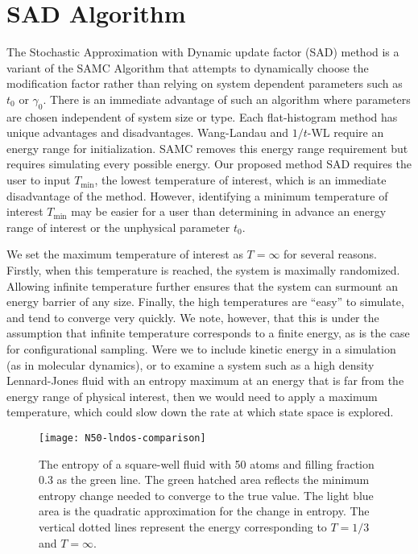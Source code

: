 \documentclass[letterpaper,twocolumn,amsmath,amssymb,pre,aps,10pt]{revtex4-1}
\begin{document}
\section{SAD Algorithm}\label{sec:sad}
The Stochastic Approximation with Dynamic update factor (SAD) method
is a variant of the SAMC Algorithm that attempts to dynamically choose
the modification factor rather than relying on system dependent
parameters such as $t_0$ or $\gamma_0$.  There is an immediate
advantage of such an algorithm where parameters are chosen independent
of system size or type. Each flat-histogram method has unique
advantages and disadvantages.  Wang-Landau and $1/t$-WL require an
energy range for initialization.  SAMC removes this energy range
requirement but requires simulating every possible energy. Our
proposed method SAD requires the user to input $T_\text{min}$, the
lowest temperature of interest, which is an immediate disadvantage of
the method. However, identifying a minimum temperature of interest
$T_\text{min}$ may be easier for a user than determining in advance
an energy range of interest or the unphysical parameter $t_0$.

We set the maximum temperature of interest as $T=\infty$ for several reasons.
Firstly, when this temperature is reached, the system is maximally randomized.
Allowing infinite temperature further ensures that the system can surmount an
energy barrier of any size.  Finally, the high temperatures are ``easy'' to
simulate, and tend to converge very quickly.  We note, however, that this is
under the assumption that infinite temperature corresponds to a finite energy,
as is the case for configurational sampling.  Were we to include kinetic energy
in a simulation (as in molecular dynamics), or to examine a system such as a
high density Lennard-Jones fluid with an entropy maximum at an energy that is
far from the energy range of physical interest, then we would need to apply a
maximum temperature, which could slow down the rate at which state space is
explored.

\begin{figure}
  \texttt{[image: N50-lndos-comparison]}
  \caption{The entropy of a square-well fluid with 50 atoms and filling fraction
        0.3 as the green line.  The green hatched area reflects the
        minimum entropy change needed to converge to the true value.
        The light blue area is the quadratic approximation
        for the change in entropy.  The vertical dotted lines represent
        the energy corresponding to $T=1/3$ and $T=\infty$.}
  \label{fig:entropy-cartoon}
\end{figure}
\end{document}
